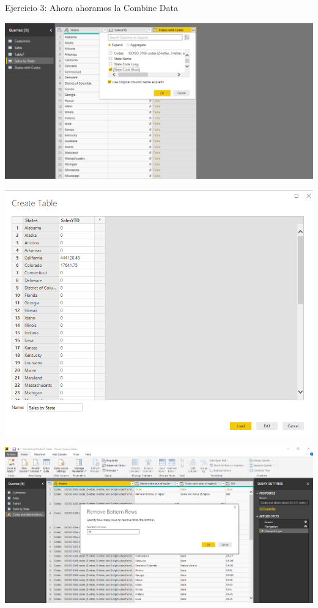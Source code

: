 Ejercicio 3: Ahora ahoramos la Combine Data\\
	\begin{center}
	\includegraphics[width=15cm]{./Imagenes/Imagen7}
	\end{center}	

	\begin{center}
	\includegraphics[width=15cm]{./Imagenes/Imagen8}
	\end{center}	
\newpage
	

	\begin{center}
	\includegraphics[width=15cm]{./Imagenes/Imagen9}
	\end{center}	
	

